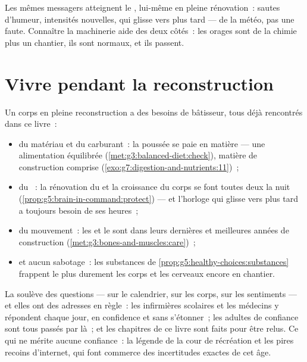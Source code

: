 \begin{remark}\label{rem:g8:puberty:moods}
Les mêmes messagers atteignent le , lui-même en pleine
rénovation~: sautes d'humeur, intensités nouvelles,  qui
glisse vers plus tard --- de la météo, pas une faute. Connaître la
machinerie aide des deux côtés~: les orages sont de la chimie plus
un chantier, ils sont normaux, et ils passent.
\end{remark}

\section{Vivre pendant la reconstruction}

\begin{proposition}\label{prop:g8:puberty:care}
Un corps en pleine reconstruction a des besoins de bâtisseur, tous
déjà rencontrés dans ce livre~:
\begin{itemize}
  \item du matériau et du carburant~: la poussée se paie en matière
        --- une alimentation équilibrée
        (\cref{met:g3:balanced-diet:check}), matière de
        construction comprise
        (\cref{exo:g7:digestion-and-nutrients:11})~;
  \item du ~: la rénovation du  et la croissance du
        corps se font toutes deux la nuit
        (\cref{prop:g5:brain-in-command:protect}) --- et l'horloge
        qui glisse vers plus tard a toujours besoin de ses heures~;
  \item du mouvement~: les  et le  sont dans leurs dernières
        et meilleures années de construction
        (\cref{met:g3:bones-and-muscles:care})~;
  \item et aucun sabotage~: les substances de
        \cref{prop:g5:healthy-choices:substances} frappent le plus
        durement les corps et les cerveaux encore en chantier.
\end{itemize}
\end{proposition}
\admitted

\begin{example}\label{ex:g8:puberty:questions}
La  soulève des questions --- sur le calendrier, sur les
corps, sur les sentiments --- et elles ont des adresses en règle~:
les infirmières scolaires et les médecins y répondent chaque jour,
en confidence et sans s'étonner~; les adultes de confiance sont tous
passés par là~; et les chapitres de ce livre sont faits pour être
relus. Ce qui ne mérite aucune confiance~: la légende de la cour de
récréation et les pires recoins d'internet, qui font commerce des
incertitudes exactes de cet âge.
\end{example}

